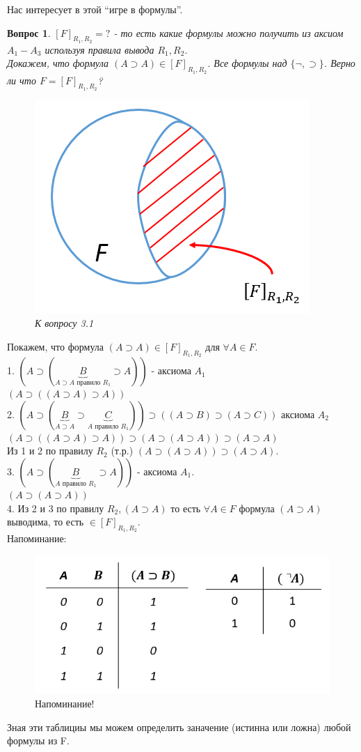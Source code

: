\documentclass{article}
\newtheorem{question}{Вопрос}
\numberwithin{example}{section}
\numberwithin{question}{section}
\numberwithin{Remark}{section}
\numberwithin{theorem}{section}
\numberwithin{definition}{section}
\numberwithin{proposition}{section}
\begin{document}
Нас интересует в этой ``игре в формулы''.
\begin{question}
	$[F]_{R_1,R_2} = ?$ - то есть какие формулы можно получить из аксиом $A_1-A_3$ используя правила вывода $R_1,R_2$.\\
	Докажем, что формула $(A\supset A)\in [F]_{R_1,R_2}$. Все формулы над $\{\lnot,\supset\}$. Верно ли что $F=[F]_{R_1,R_2}$?\\
	\begin{figure}[!htpb]
	\centering
	\includegraphics[width=0.3\linewidth]{3-1}
	\caption{К вопросу 3.1}
	\label{fig:3-1}
\end{figure}
\end{question}
	Покажем, что формула $(A\supset A)\in [F]_{R_1,R_2}$ для $\forall A\in F$.\\
	1. $(A\supset (\underbrace{B}_{A\supset A \text{ правило } R_1}\supset A))$ - аксиома $A_1$\\
	$(A\supset ((A\supset A)\supset A))$\\
	2. $(A\supset (\underbrace{B}_{A\supset A}\supset \underbrace{C}_{A \text{ правило } R_1}) )\supset ((A\supset B)\supset (A\supset C))$ аксиома $A_2$\\
	$(A\supset ((A\supset A)\supset A))\supset (A\supset (A\supset A))\supset (A\supset A)$\\
	Из 1 и 2 по правилу $R_2$ (т.р.) $(A\supset (A\supset A))\supset (A\supset A)$.\\
	3. $(A\supset (\underbrace{B}_{A \text{ правило } R_1}\supset A))$ - аксиома $A_1$.\\
	$(A\supset (A\supset A))$\\
	4. Из 2 и 3 по правилу $R_2,(A\supset A)$ то есть $\forall A\in F$ формула $(A\supset A)$ выводима, то есть $\in[F]_{R_1,R_2}$.\\
	Напоминание: 
	\begin{figure}[!htpb]
	\centering
	\includegraphics[width=0.5\linewidth]{3-2}
	\caption{Напоминание!}
	\label{fig:3-2}
\end{figure}
	Зная эти таблициы мы можем определить заначение (истинна или ложна) любой формулы из F.\\
\end{document}
